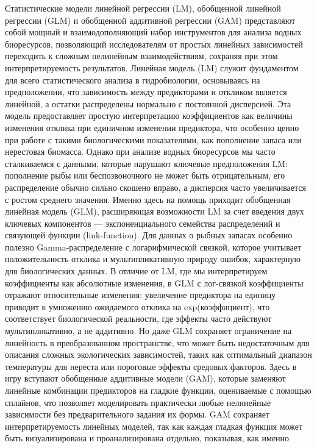 \documentclass[
  letterpaper,
  DIV=11,
  numbers=noendperiod]{scrreprt}
\begin{document}
Статистические модели линейной регрессии (LM), обобщенной линейной
регрессии (GLM) и обобщенной аддитивной регрессии (GAM) представляют
собой мощный и взаимодополняющий набор инструментов для анализа водных
биоресурсов, позволяющий исследователям от простых линейных зависимостей
переходить к сложным нелинейным взаимодействиям, сохраняя при этом
интерпретируемость результатов. Линейная модель (LM) служит фундаментом
для всего статистического анализа в гидробиологии, основываясь на
предположении, что зависимость между предикторами и откликом является
линейной, а остатки распределены нормально с постоянной дисперсией. Эта
модель предоставляет простую интерпретацию коэффициентов как величины
изменения отклика при единичном изменении предиктора, что особенно ценно
при работе с такими биологическими показателями, как пополнение запаса
или нерестовая биомасса. Однако при анализе водных биоресурсов мы часто
сталкиваемся с данными, которые нарушают ключевые предположения LM:
пополнение рыбы или беспозвоночного не может быть отрицательным, его
распределение обычно сильно скошено вправо, а дисперсия часто
увеличивается с ростом среднего значения. Именно здесь на помощь
приходит обобщенная линейная модель (GLM), расширяющая возможности LM за
счет введения двух ключевых компонентов --- экспоненциального семейства
распределений и связующей функции (link-function). Для данных о рыбных
запасах особенно полезно Gamma-распределение с логарифмической связкой,
которое учитывает положительность отклика и мультипликативную природу
ошибок, характерную для биологических данных. В отличие от LM, где мы
интерпретируем коэффициенты как абсолютные изменения, в GLM с
лог-связкой коэффициенты отражают относительные изменения: увеличение
предиктора на единицу приводит к умножению ожидаемого отклика на
exp(коэффициент), что соответствует биологической реальности, где
эффекты часто действуют мультипликативно, а не аддитивно. Но даже GLM
сохраняет ограничение на линейность в преобразованном пространстве, что
может быть недостаточным для описания сложных экологических
зависимостей, таких как оптимальный диапазон температуры для нереста или
пороговые эффекты средовых факторов. Здесь в игру вступают обобщенные
аддитивные модели (GAM), которые заменяют линейные комбинации
предикторов на гладкие функции, оцениваемые с помощью сплайнов, что
позволяет моделировать практически любые нелинейные зависимости без
предварительного задания их формы. GAM сохраняет интерпретируемость
линейных моделей, так как каждая гладкая функция может быть
визуализирована и проанализирована отдельно, показывая, как именно
\end{document}
